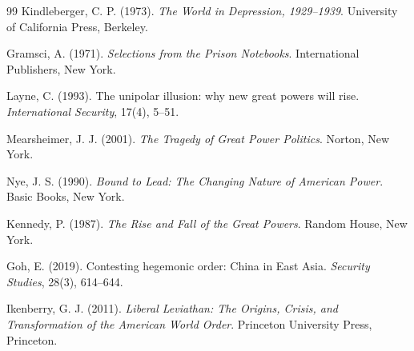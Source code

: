 \documentclass[12pt]{article}
\theoremstyle{plain}
\theoremstyle{definition}
\theoremstyle{remark}
\begin{document}
\begin{thebibliography}{99}
Kindleberger, C. P. (1973). \textit{The World in Depression, 1929--1939}. University of California Press, Berkeley.

Gramsci, A. (1971). \textit{Selections from the Prison Notebooks}. International Publishers, New York.

Layne, C. (1993). The unipolar illusion: why new great powers will rise. \textit{International Security}, 17(4), 5--51.

Mearsheimer, J. J. (2001). \textit{The Tragedy of Great Power Politics}. Norton, New York.

Nye, J. S. (1990). \textit{Bound to Lead: The Changing Nature of American Power}. Basic Books, New York.

Kennedy, P. (1987). \textit{The Rise and Fall of the Great Powers}. Random House, New York.

Goh, E. (2019). Contesting hegemonic order: China in East Asia. \textit{Security Studies}, 28(3), 614--644.

Ikenberry, G. J. (2011). \textit{Liberal Leviathan: The Origins, Crisis, and Transformation of the American World Order}. Princeton University Press, Princeton.

\end{thebibliography}
\end{document}
